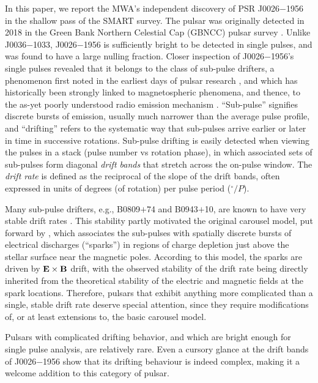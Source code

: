 \documentclass[twocolumn]{aastex631}
\newcommand{\psr}{J0026$-$1956}
\newcommand{\psrnick}{J0036$-$1033}
\newcommand{\ExB}{\ensuremath{{\bf E}\times{\bf B}}}
\begin{document}
In this paper, we report the MWA's independent discovery of PSR \psr{} in the shallow pass of the SMART survey.
The pulsar was originally detected in 2018 in the Green Bank Northern Celestial Cap (GBNCC) pulsar survey \citep{Stovall2014}.
Unlike \psrnick{}, \psr{} is sufficiently bright to be detected in single pulses, and was found to have a large nulling fraction.
Closer inspection of \psr{}'s single pulses revealed that it belongs to the class of sub-pulse drifters, a phenomenon first noted in the earliest days of pulsar research \citep{Drake1968}, and which has historically been strongly linked to magnetospheric phenomena, and thence, to the as-yet poorly understood radio emission mechanism \citep{Ruderman1975,Rankin1986,Deshpande1999,McSweeney2019a}.
``Sub-pulse'' signifies discrete bursts of emission, usually much narrower than the average pulse profile, and ``drifting'' refers to the systematic way that sub-pulses arrive earlier or later in time in successive rotations.
Sub-pulse drifting is easily detected when viewing the pulses in a stack (pulse number vs rotation phase), in which associated sets of sub-pulses form diagonal \textit{drift bands} that stretch across the on-pulse window.
The \textit{drift rate} is defined as the reciprocal of the slope of the drift bands, often expressed in units of degrees (of rotation) per pulse period ($^\circ/P$).

Many sub-pulse drifters, e.g., B0809$+$74 and B0943$+$10, are known to have very stable drift rates \citep[e.g.][]{Taylor1971,Deshpande1999}.
This stability partly motivated the original carousel model, put forward by \citet{Ruderman1975}, which associates the sub-pulses with spatially discrete bursts of electrical discharges (``sparks'') in regions of charge depletion just above the stellar surface near the magnetic poles.
According to this model, the sparks are driven by \ExB{} drift, with the observed stability of the drift rate being directly inherited from the theoretical stability of the electric and magnetic fields at the spark locations.
Therefore, pulsars that exhibit anything more complicated than a single, stable drift rate deserve special attention, since they require modifications of, or at least extensions to, the basic carousel model.

Pulsars with complicated drifting behavior, and which are bright enough for single pulse analysis, are relatively rare.
Even a cursory glance at the drift bands of \psr{} show that its drifting behaviour is indeed complex, making it a welcome addition to this category of pulsar.
\end{document}
